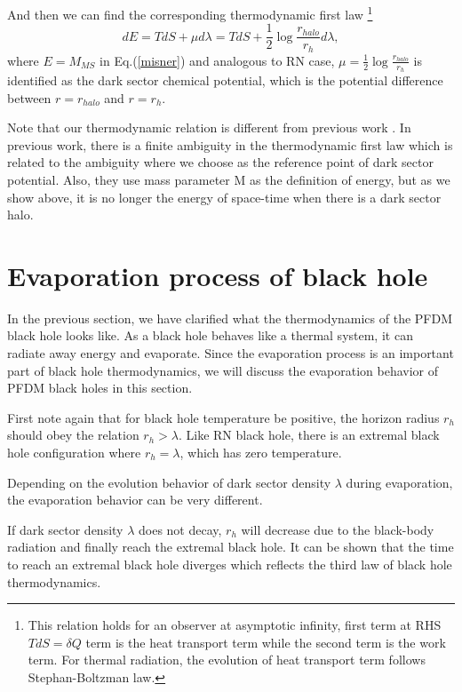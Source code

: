 \documentclass[a4paper,11pt]{article}
\begin{document}
And then we can find the corresponding thermodynamic first law \footnote{This relation holds for an observer at asymptotic infinity, first term at RHS $TdS=\delta Q$ term is the heat transport term while the second term is the work term. For thermal radiation, the evolution of heat transport term follows Stephan-Boltzman law.} 
\begin{equation}
dE=TdS+\mu d\lambda=TdS+\frac{1}{2} \log \frac{r_{halo}}{r_{h}} d\lambda,
\end{equation}
where $E=M_{MS}$ in Eq.(\ref{misner}) and analogous to RN case, $\mu=\frac{1}{2} \log \frac{r_{halo}}{r_{h}}$ is identified as the dark sector chemical potential, which is the potential difference between $r=r_{halo}$ and $r=r_{h}$.

Note that our thermodynamic relation is different from previous work \cite{Xu:2016ylr,Cao:2021dcq}. In previous work, there is a finite
ambiguity in the thermodynamic first law which is related to the ambiguity where we choose as the
reference point of dark sector potential. Also, they use mass parameter M as the definition of energy, but
as we show above, it is no longer the energy of space-time when there is a dark sector halo. 

\section{Evaporation process of black hole} \label{evop}

In the previous section, we have clarified what the thermodynamics of the PFDM black hole looks like. As a black hole behaves like a thermal system, it can radiate away energy and evaporate. Since the evaporation process is an important part of black hole thermodynamics, we will discuss the evaporation behavior of PFDM black holes in this section. 

First note again that for black hole temperature be positive, the horizon radius $r_{h}$ should obey the relation $r_{h}>\lambda$. Like RN black hole, there is an extremal black hole configuration where $r_{h}=\lambda$, which has zero temperature. 

Depending on the evolution behavior of dark sector density $\lambda$ during evaporation, the evaporation behavior can be very different. 

If dark sector density $\lambda$ does not decay, $r_{h}$ will decrease due to the black-body radiation and finally reach the extremal black hole. It can be shown that the time to reach an extremal black hole diverges which reflects the third law of black hole thermodynamics. 
\end{document}
